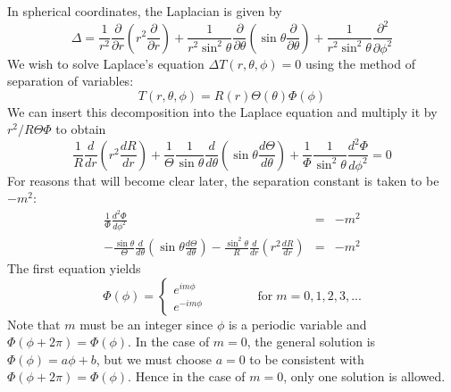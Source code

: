 \newpage
In spherical coordinates, the Laplacian is given by
\[
\Delta = 
\frac{1}{r^2} \frac{\partial }{\partial r} \left( r^2 \frac{\partial }{\partial r} \right)
+
\frac{1}{r^2 \sin^2 \theta} \frac{\partial}{\partial \theta} \left( \sin\theta \frac{\partial }{\partial \theta} \right)
+
\frac{1}{r^2 \sin^2 \theta} \frac{\partial^2}{\partial \phi^2}
\]
We wish to solve Laplace's equation $\Delta T(r,\theta,\phi)=0$ using the method 
of separation of variables:
\[
T(r,\theta,\phi) = R(r) \Theta(\theta) \Phi(\phi)
\]
We can insert this decomposition into the Laplace equation and multiply it by $r^2/R\Theta\Phi$ to obtain
\[
\frac{1}{R} \frac{d}{dr} \left( r^2 \frac{dR}{dr} \right) 
+ 
\frac{1}{\Theta} \frac{1}{\sin \theta} \frac{d}{d\theta} \left( \sin \theta \frac{d\Theta}{d\theta} \right)
+
\frac{1}{\Phi} \frac{1}{\sin^2 \theta} \frac{d^2\Phi}{d\phi^2}
=
0
\]
For reasons that will become clear later, the separation constant  is taken to be $-m^2$:
\begin{eqnarray}
\frac{1}{\Phi} \frac{d^2\Phi}{d\phi^2} &=& -m^2  \label{eq:spha2} \\
-\frac{\sin\theta}{\Theta} \frac{d}{d\theta} \left( \sin \theta \frac{d\Theta}{d\theta} \right)
- \frac{\sin^2\theta}{R} \frac{d}{dr} \left( r^2 \frac{dR}{dr} \right) &=& -m^2  \label{eq:spha2}
\end{eqnarray}
The first equation yields
\[
\Phi(\phi) = 
\left\{
\begin{array}{c}
e^{im\phi} \\ e^{-im\phi}
\end{array}
\right.
\qquad\qquad 
\text{for} \; m=0,1,2,3,...
\]
Note that $m$ must be an integer since $\phi$ is a periodic variable and $\Phi(\phi + 2\pi) = \Phi(\phi)$. 
In the case of $m=0$, the general solution is $\Phi(\phi) = a\phi + b$, but we must choose $a=0$ to
be consistent with $\Phi(\phi + 2\pi) = \Phi(\phi)$. Hence in the case of $m = 0$, only one solution is
allowed.

